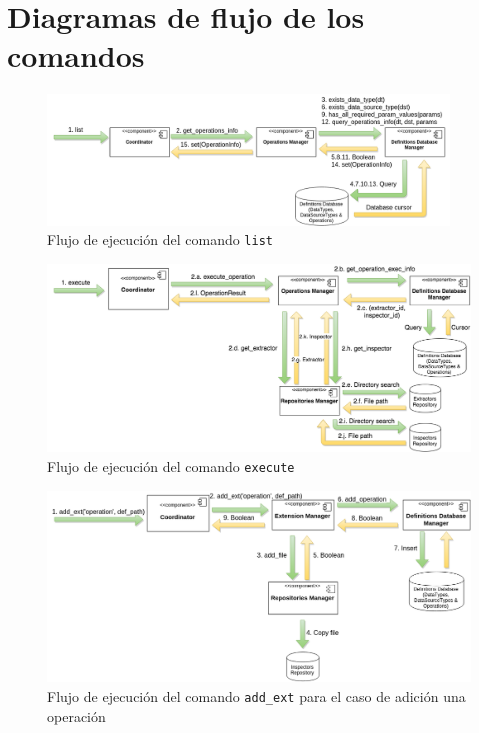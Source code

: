 \chapter{Diagramas de flujo de los comandos}
\label{diagramasFlujo}
\begin{figure}[H]
    \begin{center}
        \includegraphics[width=0.95\textwidth]{figures/list_operations}
        \caption{Flujo de ejecución del comando \texttt{list}}
    \end{center}
\end{figure}

\begin{figure}[H]
    \begin{center}
        \includegraphics[width=\textwidth]{figures/execute_operations}
        \caption{Flujo de ejecución del comando \texttt{execute}}
    \end{center}
\end{figure}

\begin{figure}[H]
    \begin{center}
        \includegraphics[width=\textwidth]{figures/add_ext}
        \caption{Flujo de ejecución del comando \texttt{add\_ext} para el caso de adición una operación}
    \end{center}
\end{figure}

